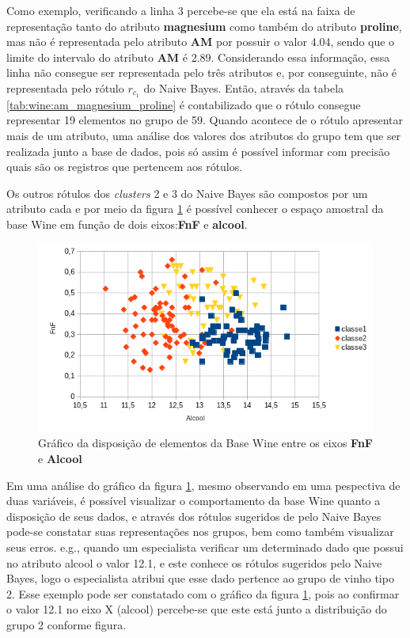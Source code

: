 Como exemplo, verificando a linha 3 percebe-se que ela está na faixa de representação tanto do atributo \textbf{magnesium} como também do atributo \textbf{proline}, mas não é representada pelo atributo \textbf{AM} por possuir o valor 4.04, sendo que o limite do intervalo do atributo \textbf{AM} é 2.89. Considerando essa informação, essa linha não consegue ser representada pelo três atributos e, por conseguinte, não é representada pelo rótulo  ${r_{c_1}}$ do Naive Bayes. Então, através da tabela \ref{tab:wine:am_magnesium_proline} é contabilizado que o rótulo consegue representar 19 elementos no grupo de 59. Quando acontece de o rótulo apresentar mais de um atributo, uma análise dos valores dos atributos do grupo tem que ser realizada junto a base de dados, pois só assim é possível informar com precisão quais são os registros que pertencem aos rótulos. 

  
Os outros rótulos dos \textit{clusters} 2 e 3 do Naive Bayes são compostos por um atributo cada e por meio da figura \ref{fig:grafico_wine_alcool_FnF} é possível conhecer o espaço amostral da base Wine em função de dois eixos:\textbf{FnF} e \textbf{alcool}. 

\begin{figure}[h!]
        \centering
        \includegraphics[scale=0.9]{figs/grafico_wine_alcool_FnF.png}
        \caption{Gráfico da disposição de elementos da Base Wine entre os eixos \textbf{FnF} e \textbf{Alcool}} \label{fig:grafico_wine_alcool_FnF}
\end{figure}

Em uma análise do gráfico da figura \ref{fig:grafico_wine_alcool_FnF}, mesmo observando em uma pespectiva de duas variáveis, é possível visualizar o comportamento da base Wine quanto a disposição de seus dados, e através dos rótulos  sugeridos de pelo Naive Bayes pode-se constatar suas representações nos grupos, bem como também visualizar seus erros. e.g., quando um especialista verificar um determinado dado que possui no atributo alcool o valor 12.1, e este conhece os rótulos sugeridos pelo Naive Bayes, logo o especialista atribui que esse dado pertence ao grupo de vinho tipo 2. Esse exemplo pode ser constatado  com o gráfico da figura \ref{fig:grafico_wine_alcool_FnF}, pois ao confirmar o valor 12.1 no eixo X (alcool) percebe-se que este está junto a distribuição do grupo 2 conforme figura.


